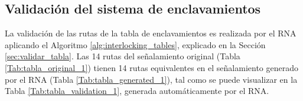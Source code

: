 \subsection{Validación del sistema de enclavamientos}
	
    La validación de las rutas de la tabla de enclavamientos es realizada por el RNA aplicando el Algoritmo \ref{alg:interlocking_tables}, explicado en la Sección \ref{sec:validar_tabla}. Las 14 rutas del señalamiento original (Tabla \ref{Tab:tabla_original_1}) tienen 14 rutas equivalentes en el señalamiento generado por el RNA (Tabla \ref{Tab:tabla_generated_1}), tal como se puede visualizar en la Tabla \ref{Tab:tabla_validation_1}, generada automáticamente por el RNA.

    \begin{table}[H]
        {
        \caption{Equivalencias entre las rutas originales y las generadas por el RNA.}
        \label{Tab:tabla_validation_1}
        \centering
            \begin{center}
            \end{center}
        }    
    \end{table}
    
